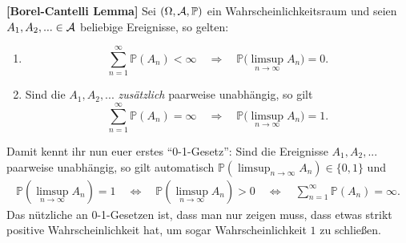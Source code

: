 \begin{satz}\label{BC}
 \textbf{[Borel-Cantelli Lemma]}
	Sei $(\Omega, \mathcal{A}, \mathbb{P})$ ein Wahrscheinlichkeitsraum und seien $A_1,A_2,... \in \mathcal{A}$ beliebige Ereignisse, so gelten:
	\begin{enumerate}[label=(\roman*)]
		\item \[ \sum\limits_{n = 1}^{\infty} \mathbb{P}(A_n) < \infty \quad \Rightarrow\quad  \mathbb{P}\big(\limsup\limits_{n \to \infty} A_n\big) =0. \]
		\item Sind die $A_1, A_2, ...$ \textit{zusätzlich} paarweise unabhängig, so gilt \[ \sum\limits_{n = 1}^{\infty} \mathbb{P}(A_n) = \infty \quad \Rightarrow \quad \mathbb{P}\big(\limsup\limits_{n \to \infty} A_n\big) = 1. \]
	\end{enumerate}
\end{satz}
	Damit kennt ihr nun euer erstes \enquote{0-1-Gesetz}: Sind die Ereignisse $A_1, A_2, ...$ paarweise unabh\"angig, so gilt automatisch $\mathbb P(\limsup_{n\to\infty} A_n)\in \{0,1\}$ und
	\begin{align*}
		\mathbb P(\limsup_{n\to\infty}A_n)=1\quad \Longleftrightarrow \quad\mathbb P(\limsup_{n\to\infty}A_n)>0\quad \Longleftrightarrow \quad  \sum_{n=1}^\infty \mathbb P(A_n)=\infty.
	\end{align*}
	 Das n\"utzliche an 0-1-Gesetzen ist, dass man nur zeigen muss, dass etwas strikt positive Wahrscheinlichkeit hat, um sogar Wahrscheinlichkeit $1$ zu schlie\ss en. 

